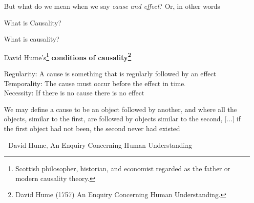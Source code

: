 \documentclass[aspectratio=169]{beamer}
\begin{document}
\begin{frame}
\frametitle{}

\begin{center}
    But what do we mean when we say \textit{cause and effect}? Or, in other words    
\end{center}
\vspace{0.3cm}

\begin{center}
    \alert{\Huge What is Causality?}
\end{center}

\end{frame}

\begin{frame}{What is causality?}

\begin{center}
    David Hume’s\footnote{\scriptsize Scottish philosopher, historian, and economist regarded as the father or modern causality theory.} \textbf{conditions of causality\footnote{\scriptsize David Hume (1757) An Enquiry Concerning Human Understanding.}}
\end{center}


\hspace{0.7cm} \textcolor{firebrick3}{Regularity:}  A cause is something that is regularly followed by an effect \\
\hspace{0.7cm} \textcolor{deepskyblue3}{Temporality:}  The cause must occur before the effect in time. \\
\hspace{0.7cm} \textcolor{darkolivegreen3}{Necessity:}  If there is no cause there is no effect

\vspace{0.3cm}

\begin{center}
\begin{tcolorbox}[enhanced,sharp corners,
    width=14.5cm,
    colback=white,
    overlay={
        \node[anchor=north west,fill=white,draw=white,circle,inner sep=1pt] 
        at ([xshift=-0.17cm,yshift=0.2cm]frame.north west) {\faQuoteLeft};
        \node[anchor=south east,fill=white,draw=white,circle,inner sep=1pt] 
        at ([xshift=0.17cm,yshift=-0.2cm]frame.south east) {\faQuoteRight};
    }
    ]
    We may define a cause to be \textcolor{deepskyblue3}{an object followed by another}, and where \textcolor{firebrick3}{all the objects, similar to the first, are followed by objects similar to the second}, [...] \textcolor{darkolivegreen3}{if the first object had not been, the second never had existed} \\
    \vspace{0cm}

    {\small - David Hume, An Enquiry Concerning Human Understanding}
\end{tcolorbox}
\end{center}

\end{frame}
\end{document}

